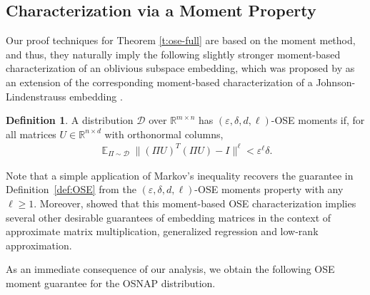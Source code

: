 \documentclass[11pt]{amsart}
\numberwithin{equation}{section}
\numberwithin{equation}{section}
\DeclareMathOperator{\E}{\mathbb{E}}
\theoremstyle{remark}
\theoremstyle{definition}
\newtheorem{definition}[theorem]{Definition}
\begin{document}
\subsection{Characterization via a Moment Property}
\label{s:osemoments}

Our proof techniques for Theorem \ref{t:ose-full} are based on the moment method, and thus, they naturally imply the following slightly stronger moment-based characterization of an oblivious subspace embedding, which was proposed by \cite{cohen2016optimal} as an extension of the corresponding moment-based characterization of a Johnson-Lindenstrauss embedding \cite{kane2014sparser}.
\begin{definition}\label{d:osemoments}
    A distribution $\mathcal{D}$ over $\mathbb{R}^{m \times n}$ has
$(\varepsilon,\delta,d,\ell)$-OSE moments if, for all matrices
$U \in \mathbb{R}^{n \times d}$ with orthonormal columns,
\begin{align*}
  \E_{\Pi \sim \mathcal{D}}
  \bigl\|(\Pi U)^{T}(\Pi U) - I\bigr\|^{\ell}
  < \varepsilon^{\ell}\delta.
\end{align*}
\end{definition}
Note that a simple application of Markov's inequality recovers the guarantee in Definition~\ref{def:OSE} from the $(\varepsilon,\delta,d,\ell)$-OSE moments property with any $\ell\geq 1$. Moreover, \cite{cohen2016optimal} showed that this moment-based OSE characterization implies several other desirable guarantees of embedding matrices in the context of approximate matrix multiplication, generalized regression and low-rank approximation.

As an immediate consequence of our analysis, we obtain the following OSE moment guarantee for the OSNAP distribution.
\end{document}
